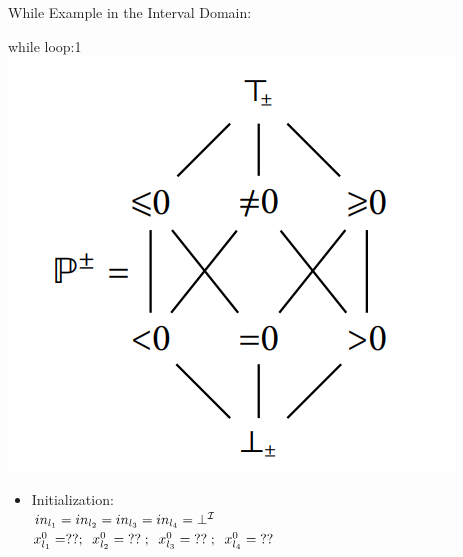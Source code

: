 \begin{frame}{While Example in the Interval Domain:}
\begin{exampleblock}{while loop:1}
	\centering 
	\centering \includegraphics[scale=0.60]{content/images/static-analysis/sign1.png}
	
	\begin{itemize}
		\item Initialization: 
		\\ $\scriptsize in_{l_1}=in_{l_2}=in_{l_3}=in_{l_4}=\bot^{\mathcal{I}}$
		\\ $\scriptsize x_{l_1}^0 =?? ;~~x_{l_2}^0 =~??~;~~x_{l_3}^0 =~??~;~~x_{l_4}^0 =~??$
	\end{itemize}
\end{exampleblock}
\end{frame}

